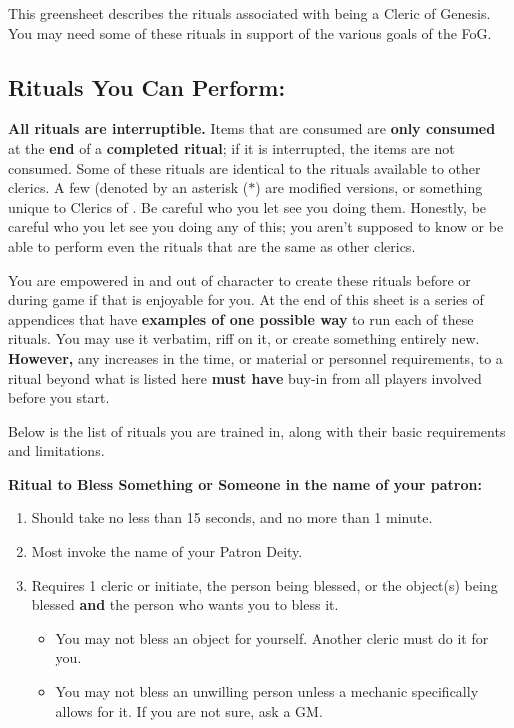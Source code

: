 \documentclass[green]{GL2020}
\begin{document}
\name{\gFoGCleric{}}

This greensheet describes the rituals associated with being a Cleric of Genesis. You may need some of these rituals in support of the various goals of the FoG.

\subsection*{Rituals You Can Perform:}
\textbf{All rituals are interruptible.} Items that are consumed are \textbf{only consumed }at the \textbf{end} of a \textbf{completed ritual}; if it is interrupted, the items are not consumed. Some of these rituals are identical to the rituals available to other clerics. A few (denoted by an asterisk ($*$) are modified versions, or something unique to Clerics of \cGenesis{}. Be careful who you let see you doing them. Honestly, be careful who you let see you doing any of this; you aren't supposed to know or be able to perform even the rituals that are the same as other clerics.

You are empowered in and out of character to create these rituals before or during game if that is enjoyable for you. At the end of this sheet is a series of appendices that have \textbf{examples of one possible way} to run each of these rituals. You may use it verbatim, riff on it, or create something entirely new. \textbf{However,} any increases in the time, or material or personnel requirements, to a ritual beyond what is listed here \textbf{must have} buy-in from all players involved before you start.

Below is the list of rituals you are trained in, along with their basic requirements and limitations.

\textbf{Ritual to Bless Something or Someone in the name of your patron:}
  \begin{enumerate}
    \item Should take no less than 15 seconds, and no more than 1 minute.
    \item Most invoke the name of your Patron Deity.
    \item Requires 1 cleric or initiate, the person being blessed, or the object(s) being blessed \textbf{and} the person who wants you to bless it. 
    \begin{itemize}
      \item You may not bless an object for yourself. Another cleric must do it for you.
      \item You may not bless an unwilling person unless a mechanic specifically allows for it. If you are not sure, ask a GM.
    \end{itemize}
  \end{enumerate}
\end{document}
